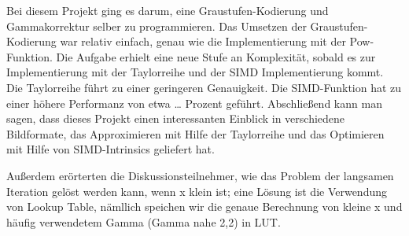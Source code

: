 \documentclass[course=erap]{aspdoc}
\begin{document}
\par
Bei diesem Projekt ging es darum, eine Graustufen-Kodierung und Gammakorrektur selber zu programmieren. Das Umsetzen der Graustufen-Kodierung war relativ einfach, genau wie die Implementierung mit der Pow-Funktion. Die Aufgabe erhielt eine neue Stufe an Komplexität, sobald es zur Implementierung mit der Taylorreihe und der SIMD Implementierung kommt. Die Taylorreihe führt zu einer geringeren Genauigkeit. Die SIMD-Funktion hat zu einer höhere Performanz von etwa … Prozent geführt. Abschließend kann man sagen, dass dieses Projekt einen interessanten Einblick in verschiedene Bildformate, das Approximieren mit Hilfe der Taylorreihe und das Optimieren mit Hilfe von SIMD-Intrinsics geliefert hat.

\par
Außerdem erörterten die Diskussionsteilnehmer, wie das Problem der langsamen Iteration gelöst werden kann, wenn x klein ist; eine Lösung ist die Verwendung von Lookup Table\cite{jungck2011packetC}, nämllich speichen wir die genaue Berechnung von kleine x und häufig verwendetem Gamma (Gamma nahe 2,2) in LUT.



\end{document}
